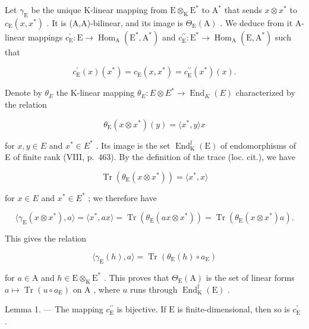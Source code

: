 Let \(\gamma_{\mathrm{E}}\) be the unique K-linear mapping from \(\mathrm{E} \otimes_{\mathrm{K}} \mathrm{E}^{*}\) to \(\mathrm{A}^{*}\) that sends \(x \otimes x^{*}\) to \(c_{\mathrm{E}}(x, x^{*})\) . It is (A,A)-bilinear, and its image is \(\Theta_{\mathrm{E}}(\mathrm{A})\) . We deduce from it A-linear mappings \(c_{\mathrm{E}}^{\prime}: \mathrm{E} \to \operatorname{Hom}_{\mathrm{A}}(\mathrm{E}^{*}, \mathrm{A}^{*})\) and \(c_{\mathrm{E}}^{\prime \prime}: \mathrm{E}^{*} \to \operatorname{Hom}_{\mathrm{A}}(\mathrm{E}, \mathrm{A}^{*})\) such that

\[
c _ {\mathrm{E}} ^ {\prime} (x) (x ^ {*}) = c _ {\mathrm{E}} (x, x ^ {*}) = c _ {\mathrm{E}} ^ {\prime \prime} (x ^ {*}) (x).
\]

Denote by \(\theta_{E}\) the K-linear mapping \(\theta_{E}: E \otimes E^{*} \to \operatorname{End}_{K}(E)\) characterized by the relation

\[
\theta_ {\mathrm{E}} (x \otimes x ^ {*}) (y) = \langle x ^ {*}, y \rangle x
\]

for \(x, y \in E\) and \(x^{*} \in E^{*}\) . Its image is the set \(\operatorname{End}_{\mathrm{K}}^{\mathrm{f}}(\mathrm{E})\) of endomorphisms of E of finite rank (VIII, p.~463). By the definition of the trace (loc. cit.), we have

\[
\operatorname{Tr} \left(\theta_ {\mathrm{E}} \left(x \otimes x ^ {*}\right)\right) = \langle x ^ {*}, x \rangle
\]

for \(x \in E\) and \(x^{*} \in E^{*}\) ; we therefore have

\[
\langle \gamma_ {\mathrm{E}} (x \otimes x ^ {*}), a \rangle = \langle x ^ {*}, a x \rangle = \operatorname{Tr} (\theta_ {\mathrm{E}} (a x \otimes x ^ {*})) = \operatorname{Tr} (\theta_ {\mathrm{E}} (x \otimes x ^ {*}) a).
\]

This gives the relation

\[
\langle \gamma_ {\mathrm{E}} (h), a \rangle = \operatorname{Tr} (\theta_ {\mathrm{E}} (h) \circ a _ {\mathrm{E}})
\]

for \(a \in \mathrm{A}\) and \(h \in \mathrm{E} \otimes_{\mathrm{K}} \mathrm{E}^*\) . This proves that \(\Theta_{\mathrm{E}}(\mathrm{A})\) is the set of linear forms \(a \mapsto \operatorname{Tr}(u \circ a_{\mathrm{E}})\) on \(\mathrm{A}\) , where \(u\) runs through \(\operatorname{End}_{\mathrm{K}}^{\mathrm{f}}(\mathrm{E})\) .

Lemma 1. --- The mapping \(c_{\mathrm{E}}^{\prime \prime}\) is bijective. If \(\mathrm{E}\) is finite-dimensional, then so is \(c_{\mathrm{E}}^{\prime}\) .

